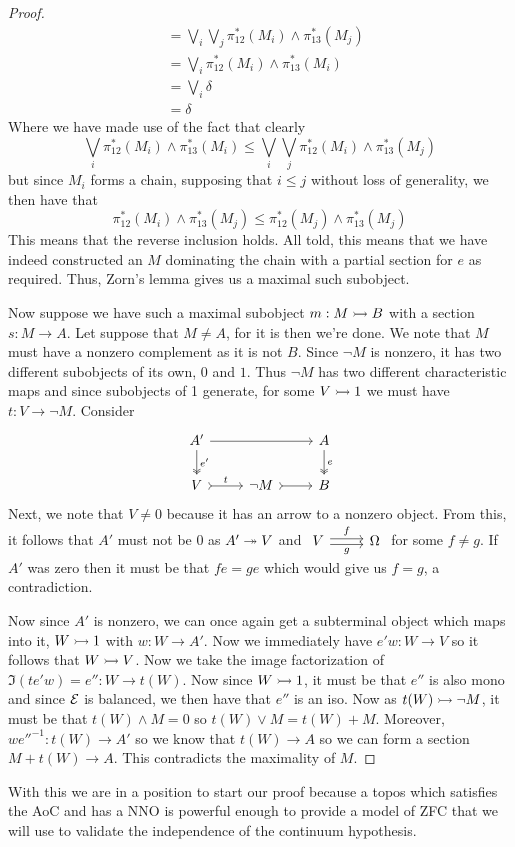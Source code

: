 \begin{proof}
\begin{align*}
      &= \bigvee_i \bigvee_j \pi_{12}^*(M_i) \wedge \pi_{13}^*(M_j)\\
      &= \bigvee_i \pi_{12}^*(M_i) \wedge \pi_{13}^*(M_i)\\
      &= \bigvee_i \delta\\
      &= \delta
  \end{align*}
  Where we have made use of the fact that clearly
  \[
    \bigvee_i \pi_{12}^*(M_i) \wedge \pi_{13}^*(M_i) \le
    \bigvee_i \bigvee_j \pi_{12}^*(M_i) \wedge \pi_{13}^*(M_j)
  \]
  but since $M_i$ forms a chain, supposing that $i \le j$ without loss
  of generality, we then have that
  \[
    \pi_{12}^*(M_i) \wedge \pi_{13}^*(M_j) \le \pi_{12}^*(M_j) \wedge \pi_{13}^*(M_j)
  \]
  This means that the reverse inclusion holds. All told, this means
  that we have indeed constructed an $M$ dominating the chain with a
  partial section for $e$ as required. Thus, Zorn's lemma gives us a
  maximal such subobject.

  Now suppose we have such a maximal subobject $m : M \rightarrowtail B$ with a
  section $s : M \to A$. Let suppose that $M \neq A$, for it is then
  we're done. We note that $M$ must have a nonzero complement as it is
  not $B$. Since $\neg M$ is nonzero, it has two different subobjects
  of its own, $0$ and $1$. Thus $\neg M$ has two different
  characteristic maps and since subobjects of 1 generate, for some
  $V \rightarrowtail 1$ we must have $t : V \to \neg M$. Consider
  \[
    \begin{tikzcd}
      A' \ar[d, "e'", twoheadrightarrow] \ar[rr] & & A \ar[d, twoheadrightarrow, "e"]\\
      V \ar[r, rightarrowtail, "t"] & \neg M \ar[r, rightarrowtail] & B
    \end{tikzcd}
  \]
  Next, we note that $V \neq 0$ because it has an arrow to a nonzero
  object. From this, it follows that $A'$ must not be 0 as $A' \twoheadrightarrow V$
  and
  $\begin{tikzcd}
    V \ar[r, "f", shift left=0.2em] \ar[r, "g", swap, shift right=0.2em] & \Omega
  \end{tikzcd}$
  for some $f \neq g$. If $A'$ was zero then it must be that $fe = ge$
  which would give us $f = g$, a contradiction.

  Now since $A'$ is nonzero, we can once again get a subterminal
  object which maps into it, $W \rightarrowtail 1$ with $w : W \to A'$. Now we
  immediately have $e'w : W \to V$ so it follows that $W \rightarrowtail V$. Now
  we take the image factorization of $\Im(te'w) = e'' : W \to t(W)$.
  Now since $W \rightarrowtail 1$, it must be that $e''$ is also mono and since
  $\mathcal{E}$ is balanced, we then have that $e''$ is an iso. Now as
  $t(W) \rightarrowtail \neg M$, it must be that $t(W) \wedge M = 0$ so
  $t(W) \vee M = t(W) + M$. Moreover, $we''^{-1} : t(W) \to A'$ so we
  know that $t(W) \to A$ so we can form a section $M + t(W) \to A$.
  This contradicts the maximality of $M$.
\end{proof}

With this we are in a position to start our proof because a topos
which satisfies the AoC and has a NNO is powerful enough to provide a
model of ZFC that we will use to validate the independence of the
continuum hypothesis.
